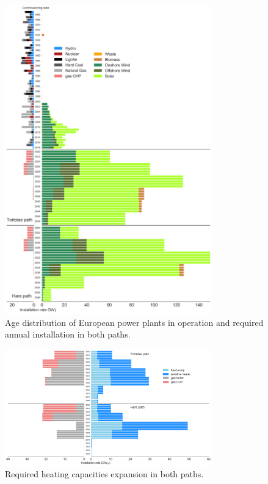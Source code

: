 \documentclass[5p]{elsarticle} %
\begin{document}
\begin{figure}[!h]
\centering
\includegraphics[width=0.8\textwidth]{figures/age_distribution_Base.png}
\caption{Age distribution of European power plants in operation \cite{powerplantmatching, IRENA_2019} and required annual installation in both paths.} \label{fig_age_distribution} 
\end{figure}

\begin{figure}[!h]
\centering
\includegraphics[width=0.8\textwidth]{figures/heating_expansion_Base.png}
\caption{Required heating capacities expansion in both paths.} \label{fig_heating_expansion} 
\end{figure}
\end{document}

